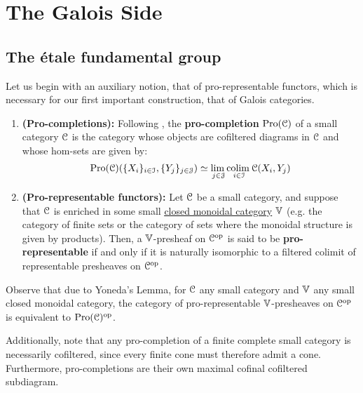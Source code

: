 \section{The Galois Side}
    \subsection{The \'etale fundamental group}
        Let us begin with an auxiliary notion, that of pro-representable functors, which is necessary for our first important construction, that of Galois categories.
        \begin{definition} \label{def: pro_representable_functors}
            \noindent
            \begin{enumerate}
                \item \textbf{(Pro-completions):} Following \cite[Definition 2.1]{isaksen_2001_limits_and_colimits_in_pro_categories}, the \textbf{pro-completion} $\mathrm{Pro}(\mathcal{C})$ of a small category $\mathcal{C}$ is the category whose objects are cofiltered diagrams in $\mathcal{C}$ and whose hom-sets are given by:
                    $$\mathrm{Pro}(\mathcal{C})(\{X_i\}_{i \in \mathcal{I}}, \{Y_j\}_{j \in \mathcal{J}}) \simeq \underset{j \in \mathcal{J}}{\operatorname{lim} \:} \underset{i \in \mathcal{I}}{\operatorname{colim} \:} \mathcal{C}(X_i, Y_j)$$
                \item \textbf{(Pro-representable functors):} Let $\mathcal{C}$ be a small category, and suppose that $\mathcal{C}$ is enriched in some small \href{http://nlab-pages.s3.us-east-2.amazonaws.com/nlab/show/closed+monoidal+category}{\underline{closed monoidal category}} $\mathbb{V}$ (e.g. the category of finite sets or the category of sets where the monoidal structure is given by products). Then, a $\mathbb{V}$-presheaf on $\mathcal{C}^{\mathrm{op}}$ is said to be \textbf{pro-representable} if and only if it is naturally isomorphic to a filtered colimit of representable presheaves on $\mathcal{C}^{\mathrm{op}}$.
            \end{enumerate}
        \end{definition}
        \begin{remark} \label{remark: pro_representable_functors_are_ind_objects}
            Observe that due to Yoneda's Lemma, for $\mathcal{C}$ any small category and $\mathbb{V}$ any small closed monoidal category, the category of pro-representable $\mathbb{V}$-presheaves on $\mathcal{C}^{\mathrm{op}}$ is equivalent to $\mathrm{Pro}(\mathcal{C})^{\mathrm{op}}$.
            
            Additionally, note that any pro-completion of a finite complete small category is necessarily cofiltered, since every finite cone must therefore admit a cone. Furthermore, pro-completions are their own maximal cofinal cofiltered subdiagram.
        \end{remark}
        
